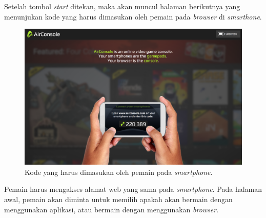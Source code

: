 Setelah tombol \textit{start} ditekan, maka akan muncul halaman berikutnya yang menunjukan kode yang harus dimasukan oleh pemain pada \textit{browser} di \textit{smarthone}. 

\begin{figure}[H]
	\centering
	\includegraphics[scale=0.2]{Gambar/con2_code1}
	\caption{Kode yang harus dimasukan oleh pemain pada \textit{smartphone}.}
	\label{fig:17_con2_code1}
\end{figure}

Pemain harus mengakses alamat web yang sama pada \textit{smartphone}. Pada halaman awal, pemain akan diminta untuk memilih apakah akan bermain dengan menggunakan aplikasi, atau bermain dengan menggunakan \textit{browser}. 

